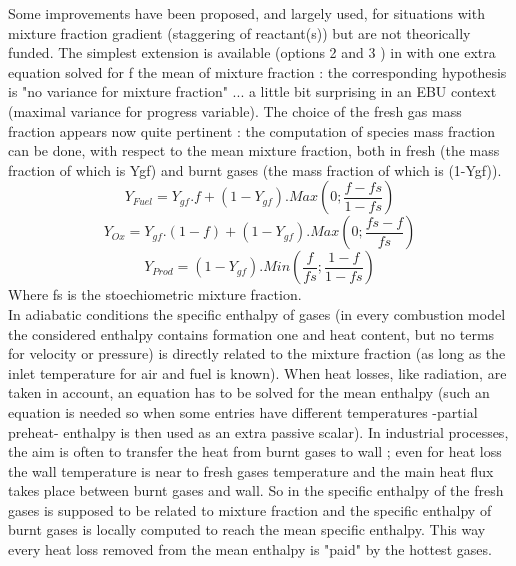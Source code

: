 Some improvements have been proposed, and largely used, for situations
with mixture fraction gradient ({\small staggering of reactant(s)})
but are not theorically funded. The simplest extension is available
({\small options 2 and 3 }) in \CS with one extra equation solved for
f the mean of mixture fraction : the corresponding hypothesis is "no
variance for mixture fraction" ... a little bit surprising in an EBU
context ({\small maximal variance for progress variable}). The choice
of the fresh gas mass fraction appears now quite pertinent : the
computation of species mass fraction can be done, with respect to the
mean mixture fraction, both in fresh ({\small the mass fraction of
which is Ygf}) and burnt gases ({\small the mass fraction of which is
(1-Ygf)}).\\
\begin{equation}
Y_{Fuel} = Y_{gf}.f + (1-Y_{gf}) . Max(0 ; \frac{f-fs}{1-fs})
\end{equation}
\begin{equation}
Y_{Ox} = Y_{gf}.(1-f) + (1-Y_{gf}) . Max(0 ; \frac{fs-f}{fs})
\end{equation}
\begin{equation}
Y_{Prod} = (1-Y_{gf}) . Min( \frac{f}{fs} ; \frac{1-f}{1-fs} )
\end{equation}
Where fs is the stoechiometric mixture fraction.\\

In adiabatic conditions the specific enthalpy of gases ({\small in
every combustion model the considered enthalpy contains formation one
and heat content, but no terms for velocity or pressure}) is directly
related to the mixture fraction ({\small as long as the inlet
temperature for air and fuel is known}). When heat losses, like
radiation, are taken in account, an equation has to be solved for the
mean enthalpy ({\small such an equation is needed so when some entries
have different temperatures -partial preheat- enthalpy is then used as
an extra passive scalar}). In industrial processes, the aim is often
to transfer the heat from burnt gases to wall ; even for heat loss the
wall temperature is near to fresh gases temperature and the main heat
flux takes place between burnt gases and wall. So in \CS the specific
enthalpy of the fresh gases is supposed to be related to mixture
fraction and the specific enthalpy of burnt gases is locally computed
to reach the mean specific enthalpy. This way every heat loss removed
from the mean enthalpy is "paid" by the hottest gases.\\

